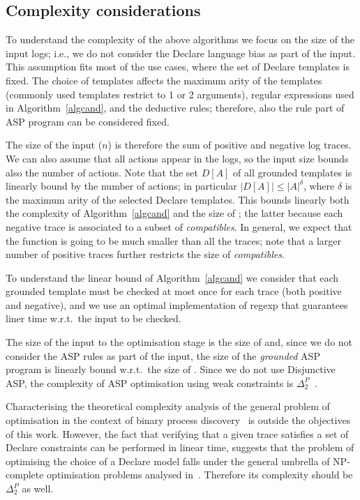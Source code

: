 \subsection{Complexity considerations}\label{sec:complexity}

To understand the complexity of the above algorithms we focus on the size of the input logs; i.e., we do not consider the Declare language bias as part of the input. This assumption fits most of the use cases, where the set of Declare templates is fixed. 
%
The choice of templates affects the maximum arity of the templates (commonly used templates restrict to 1 or 2 arguments), regular expressions used in Algorithm~\ref{algcand}, and the deductive rules; therefore, also the rule part of ASP program can be considered fixed.

The size of the input ($n$) is therefore the sum of positive and negative log traces. We can also assume that all actions appear in the logs, so the input size bounds also the number of actions. Note that the set $D[A]$ of all grounded templates is linearly bound by the number of actions; in particular $|D[A]|\leq |A|^{\delta}$, where ${\delta}$ is the maximum arity of the selected Declare templates. This bounds linearly both the complexity of Algorithm~\ref{algcand} and the size of {\textit{\sheriff}}; the latter because each negative trace is associated to a subset of \textit{compatibles}. In general, we expect that the {\textit{\sheriff}} function is going to be much smaller than all the traces; note that a larger number of positive traces further restricts the size of \textit{compatibles}.

To understand the linear bound of Algorithm~\ref{algcand} we consider that each grounded template must be checked at most once for each trace (both positive and negative), and we use an optimal implementation of regexp that guarantees liner time w.r.t.\ the input to be checked.

The size of the input to the optimisation stage is the size of {\textit{\sheriff}} and, since we do not consider the ASP rules as part of the input, the size of the \emph{grounded} ASP program is linearly bound w.r.t.\ the size of {\textit{\sheriff}}. Since we do not use Disjunctive ASP, the complexity of ASP optimisation using weak constraints is $\Delta^P_2$~\cite{ASP_constraints:2000}.

Characterising the theoretical complexity analysis of the general problem of optimisation in the context of binary process discovery~\cite{slaats_weighing_2021} is outside the objectives of this work. However, the fact that verifying that a given trace satisfies a set of Declare constraints can be performed in linear time, suggests that the problem of optimising the choice of a Declare model falls under the general umbrella of NP-complete optimisation problems analysed in~\cite{opt_complexity:1988}. Therefore its complexity should be $\Delta^P_2$ as well.
